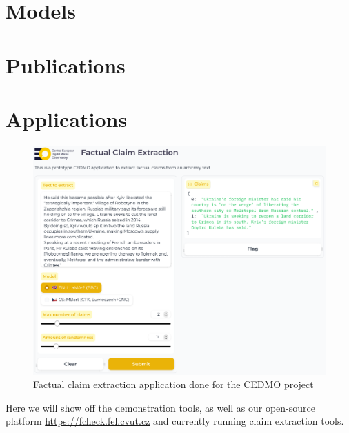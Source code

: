 \section{Models}
\label{sec:models}
\section{Publications}
\label{sec:publications}
\section{Applications}
\label{sec:applications}

\begin{figure}
    \includegraphics[width=16cm]{fig/cedmo.pdf}
    \caption{Factual claim extraction application done for the CEDMO project}
    \label{fig:framework}
\end{figure}

Here we will show off the demonstration tools, as well as our open-source platform \url{https://fcheck.fel.cvut.cz} and currently running claim extraction tools. 